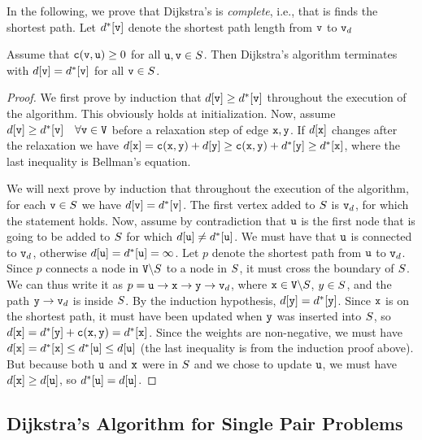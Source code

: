 In the following, we prove that Dijkstra's is \textit{complete}, i.e., that is finds the shortest path. Let $d^*[{\tt v}]$ denote the shortest path length from ${\tt v}$ to ${\tt v}_d$
\begin{theorem}
Assume that ${\tt c}({\tt v},{\tt u})\geq 0$ for all ${\tt u},{\tt v}\in{S}$. Then Dijkstra's algorithm terminates with $d[{\tt v}] = d^*[{\tt v}]$ for all ${\tt v}\in{S}$.
\end{theorem}
\begin{proof}
We first prove by induction that $d[{\tt v}] \geq d^*[{\tt v}]$ throughout the execution of the algorithm. This obviously holds at initialization. Now, assume $d[{\tt v}] \geq d^*[{\tt v}] \quad \forall {\tt v}\in{\tt V}$ before a relaxation step of edge ${\tt x},{\tt y}$. If $d[{\tt x}]$ changes after the relaxation we have $d[{\tt x}] = {\tt c}({\tt x},{\tt y}) + d[{\tt y}] \geq {\tt c}({\tt x},{\tt y}) + d^*[{\tt y}] \geq d^*[{\tt x}]$, where the last inequality is Bellman's equation.

We will next prove by induction that throughout the execution of the algorithm, for each ${\tt v} \in {S}$ we have $d[{\tt v}] = d^*[{\tt v}]$.
The first vertex added to ${S}$ is ${\tt v}_d$, for which the statement holds. Now, assume by contradiction that ${\tt u}$ is the first node that is going to be added to ${S}$ for which $d[{\tt u}] \neq d^*[{\tt u}]$. We must have that ${\tt u}$ is connected to ${\tt v}_d$, otherwise $d[{\tt u}] = d^*[{\tt u}] = \infty$. Let $p$ denote the shortest path from ${\tt u}$ to ${\tt v}_d$. Since $p$ connects a node in ${\tt V}\backslash {S}$ to a node in ${S}$, it must cross the boundary of ${S}$. We can thus write it as $p = {\tt u} \to {\tt x} \to {\tt y} \to {\tt v}_d$, where ${\tt x} \in {\tt V}\backslash {S}$, $y \in {S}$, and the path ${\tt y} \to {\tt v}_d$ is inside ${S}$.
By the induction hypothesis, $d[{\tt y}] = d^*[{\tt y}]$. Since ${\tt x}$ is on the shortest path, it must have been updated when ${\tt y}$ was inserted into ${S}$, so $d[{\tt x}] = d^*[{\tt y}] + {\tt c}({\tt x},{\tt y}) = d^*[{\tt x}]$. Since the weights are non-negative, we must have $d[{\tt x}] = d^*[{\tt x}] \leq d^*[{\tt u}] \leq d[{\tt u}]$ (the last inequality is from the induction proof above). But because both ${\tt u}$ and ${\tt x}$ were in ${S}$ and we chose to update ${\tt u}$, we must have $d[{\tt x}] \geq d[{\tt u}]$, so $d^*[{\tt u}] = d[{\tt u}]$.
\end{proof}

\subsection{Dijkstra's Algorithm for Single Pair Problems}


